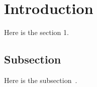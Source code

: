 \section{Introduction}

Here is the section 1.

\subsection{Subsection}

Here is the subsection~\cite{kitazato2016proxy}.